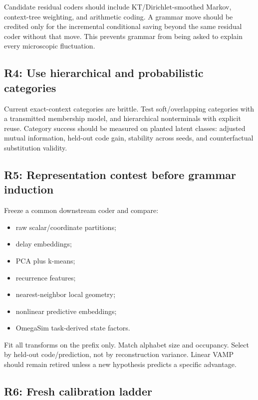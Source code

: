 \documentclass[10pt]{article}
\begin{document}
Candidate residual coders should include KT/Dirichlet-smoothed Markov,
context-tree weighting, and arithmetic coding. A grammar move should be
credited only for the incremental conditional saving beyond the same residual
coder without that move. This prevents grammar from being asked to explain
every microscopic fluctuation.

\subsection*{R4: Use hierarchical and probabilistic categories}

Current exact-context categories are brittle. Test soft/overlapping categories
with a transmitted membership model, and hierarchical nonterminals with
explicit reuse. Category success should be measured on planted latent classes:
adjusted mutual information, held-out code gain, stability across seeds, and
counterfactual substitution validity.

\subsection*{R5: Representation contest before grammar induction}

Freeze a common downstream coder and compare:

\begin{itemize}
\item raw scalar/coordinate partitions;
\item delay embeddings;
\item PCA plus k-means;
\item recurrence features;
\item nearest-neighbor local geometry;
\item nonlinear predictive embeddings;
\item OmegaSim task-derived state factors.
\end{itemize}

Fit all transforms on the prefix only. Match alphabet size and occupancy.
Select by held-out code/prediction, not by reconstruction variance. Linear VAMP
should remain retired unless a new hypothesis predicts a specific advantage.

\subsection*{R6: Fresh calibration ladder}
\end{document}
